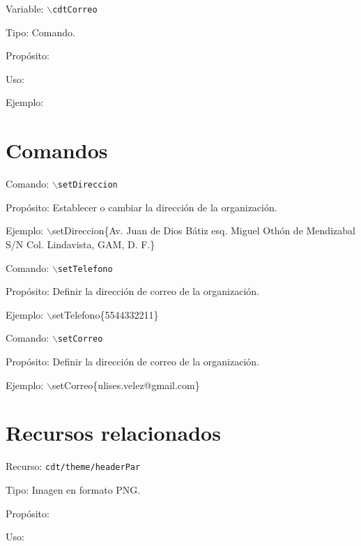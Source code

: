 \begin{Cdescription}
	\item[Variable:] {\tt $\backslash$cdtCorreo}
	\item[Tipo:] Comando.
	\item[Propósito:]
	\item[Uso:]
	\item[Ejemplo:]
\end{Cdescription}

\section{Comandos}

\begin{Cdescription}
	\item[Comando:] {\tt $\backslash$setDireccion}
	\item[Propósito:] Establecer o cambiar la dirección de la organización.
	\item[Ejemplo:] $\backslash$setDireccion\{Av. Juan de Dios Bátiz esq. Miguel Othón de Mendizabal S/N Col. Lindavista, GAM, D. F.\}	
\end{Cdescription}


\begin{Cdescription}
	\item[Comando:] {\tt $\backslash$setTelefono}
	\item[Propósito:] Definir la dirección de correo de la organización.
	\item[Ejemplo:] $\backslash$setTelefono\{5544332211\}	
\end{Cdescription}

\begin{Cdescription}
	\item[Comando:] {\tt $\backslash$setCorreo}
	\item[Propósito:] Definir la dirección de correo de la organización.
	\item[Ejemplo:] $\backslash$setCorreo\{ulises.velez@gmail.com\}	
\end{Cdescription}


\section{Recursos relacionados}

\begin{Cdescription}
	\item[Recurso:] {\tt cdt/theme/headerPar}
	\item[Tipo:] Imagen en formato PNG.
	\item[Propósito:]
	\item[Uso:]
\end{Cdescription}

